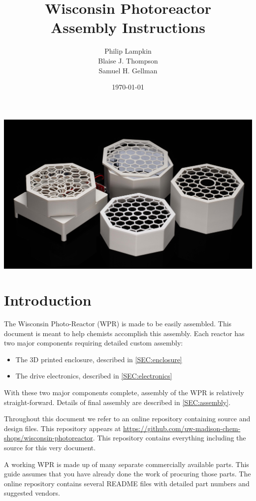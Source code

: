 \documentclass[11pt]{article}
\title{Wisconsin Photoreactor \\ Assembly Instructions}
\author{
  Philip Lampkin \\
  Blaise J. Thompson \\
  Samuel H. Gellman
  }
\date{\today}
\let\stdsection\section
\renewcommand\section{\clearpage\stdsection}
\begin{document}
\maketitle

\includegraphics[width=\textwidth]{"../coverart.jpg"}

\tableofcontents

\section{Introduction}

The Wisconsin Photo-Reactor (WPR) is made to be easily assembled.
This document is meant to help chemists accomplish this assembly.
Each reactor has two major components requiring detailed custom assembly:

\begin{itemize}
  \item The 3D printed enclosure, described in \autoref{SEC:enclosure}
  \item The drive electronics, described in \autoref{SEC:electronics}
\end{itemize}

With these two major components complete, assembly of the WPR is relatively straight-forward.
Details of final assembly are described in \autoref{SEC:assembly}.

Throughout this document we refer to an online repository containing source and design files.
This repository appears at \url{https://github.com/uw-madison-chem-shops/wisconsin-photoreactor}.
This repository contains everything including the source for this very document.

A working WPR is made up of many separate commercially available parts.
This guide assumes that you have already done the work of procuring those parts.
The online repository contains several README files with detailed part numbers and suggested vendors.
\end{document}
